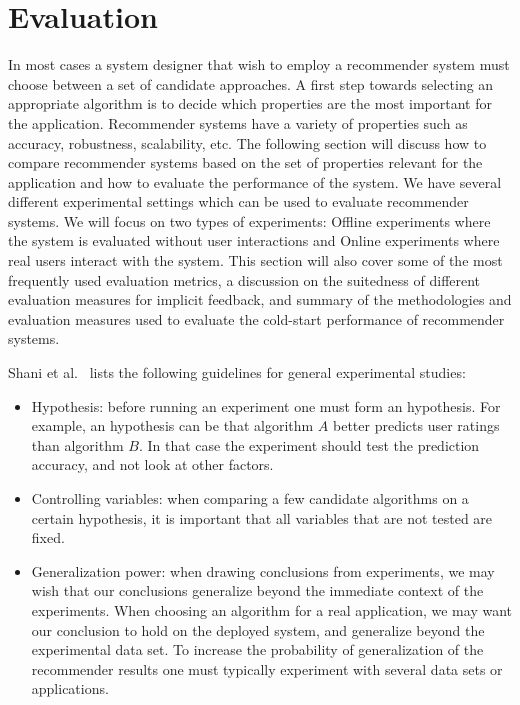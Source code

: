 \section{Evaluation}
\label{evaluation}




In most cases a system designer that wish to employ a recommender system must
choose between a set of candidate approaches. A first step towards selecting an
appropriate algorithm is to decide which properties are the most important for
the application. Recommender systems have a variety of properties such as
accuracy, robustness, scalability, etc. The following section will discuss how
to compare recommender systems based on the set of properties  relevant for the
application and how to evaluate the performance of the system. We have several
different experimental settings which can be used to evaluate recommender systems.
We will focus on two types of experiments:
Offline experiments where the system is evaluated without user interactions and
Online experiments where real users interact with the system. This section will
also cover some of the most frequently used evaluation metrics, a discussion on
the suitedness of different evaluation measures for implicit feedback, and
summary of the methodologies and evaluation measures used to evaluate the
cold-start performance of recommender systems.

Shani et al.\ \cite{Shani2011} lists the following guidelines for general
experimental studies:

\begin{itemize}
	\item Hypothesis: before running an experiment one must form an hypothesis. For
		example, an hypothesis can be that algorithm $A$ better predicts user ratings
		than algorithm $B$. In that case the experiment should test the prediction
		accuracy, and not look at other factors.

	\item Controlling variables: when comparing a few candidate algorithms on a
		certain hypothesis, it is important that all variables that are not tested
		are fixed.

	\item Generalization power: when drawing conclusions from experiments, we may
		wish that our conclusions generalize beyond the immediate context of the
		experiments. When choosing an algorithm for a real application, we may want
		our conclusion to hold on the deployed system, and generalize beyond the
		experimental data set. To increase the probability of generalization of the
		recommender results one must typically experiment with several data sets or
		applications.
\end{itemize}

